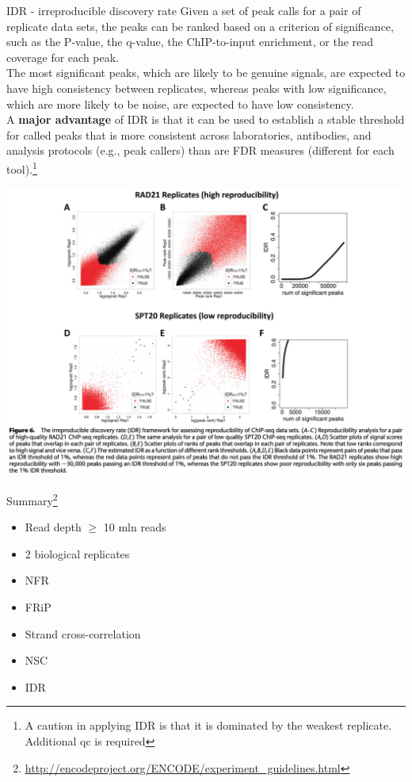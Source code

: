 \documentclass{beamer}
\begin{document}
\begin{frame}{IDR - irreproducible discovery rate}
Given a set of peak calls for a pair of replicate data sets, the peaks can be ranked based on a criterion of significance, such as the P-value, the q-value, the ChIP-to-input enrichment, or the read coverage for each peak.\\
The most significant peaks, which are likely to be genuine signals, are expected to have high consistency between replicates, whereas peaks with low significance, which are more likely to be noise, are expected to have low consistency.\\
A \textbf{major advantage} of IDR is that it can be used to establish a stable threshold for called peaks that is more consistent across laboratories, antibodies, and analysis protocols (e.g., peak callers) than are FDR measures (different for each tool).\footnote{A caution in applying IDR is that it is dominated by the weakest replicate. Additional qc is required}
\end{frame}

\begin{frame}
\includegraphics[width=\linewidth]{idr.png}
\end{frame}


\begin{frame}{Summary\footnote{\url{http://encodeproject.org/ENCODE/experiment_guidelines.html}}}
\begin{itemize}
\item Read depth $\geq$ 10 mln reads
\item 2 biological replicates
\item NFR
\item FRiP
\item Strand cross-correlation
\item NSC
\item IDR
\end{itemize}
\end{frame}
\end{document}
